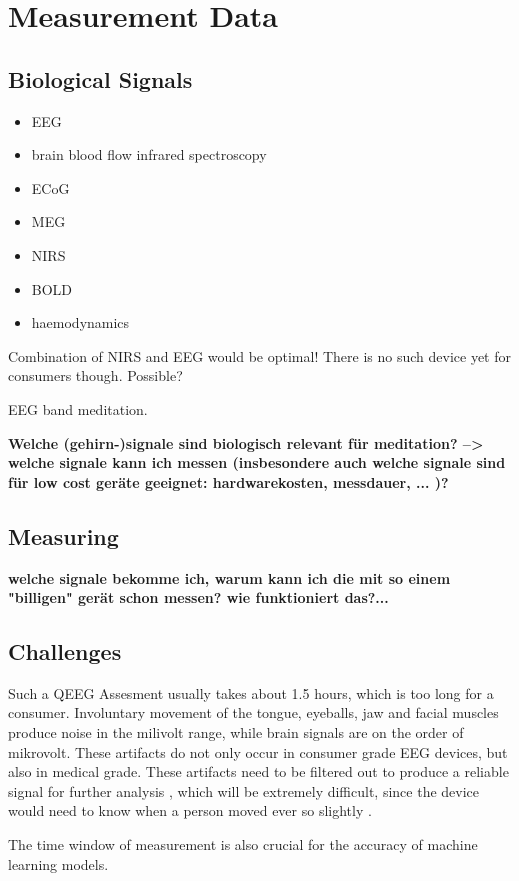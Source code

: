\documentclass{llncs} %
\begin{document}
\section{Measurement Data}
\subsection{Biological Signals}
\begin{itemize}
    \item EEG
    \item brain blood flow infrared spectroscopy
    \item ECoG
    \item MEG 
    \item NIRS
    \item BOLD
    \item haemodynamics
\end{itemize}
Combination of NIRS and EEG would be optimal! There is no such device yet for consumers though.
Possible?

EEG band meditation.



\textbf{Welche (gehirn-)signale sind biologisch relevant für meditation? --> welche signale kann ich messen (insbesondere auch welche signale sind für low cost geräte geeignet: hardwarekosten, messdauer, ... )?}


\subsection{Measuring}
\textbf{welche signale bekomme ich, warum kann ich die mit so einem "billigen" gerät schon messen? wie funktioniert das?...}
\subsection{Challenges}
Such a QEEG Assesment usually takes about 1.5 hours, which is too long for a consumer.
Involuntary movement of the tongue, eyeballs, jaw and facial muscles produce noise in the milivolt range, while brain signals are on 
the order of mikrovolt. These artifacts do not only occur in consumer grade EEG devices, but also in medical grade.
These artifacts need to be filtered out to produce a reliable signal for further analysis \cite{Bashivan: et al}, which will be extremely difficult, since the device would need to know when a person moved ever so slightly \cite{Hammond}.

The time window of measurement is also crucial for the accuracy of machine learning models. \cite{Bashivan: et al}
\end{document}
